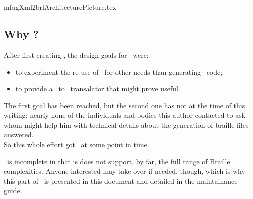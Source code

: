 



\chapter{\xmlToBrl\ }

{mfugXml2brlArchitecturePicture.tex}


\section{Why \xmlToBrl?}

After first creating \xmlToLy, the design goals for \xmlToBrl\ were:
\begin{itemize}
\item to experiment the re-use of \msrRepr\ for other needs than generating \lily\ code;
\item to provide a \mxml\ to \braille\ transalator that might prove useful.
\end{itemize}

The first goal has been reached, but the second one has not at the time of this writing: nearly none of the individuals and bodies this author contacted to ask whom might help him with technical details about the generation of braille files answered.\\
So this whole effort got \frozen\ at some point in time.

\xmlToBrl\ is incomplete in that is does not support, by far, the full range of Braille complexities. Anyone interested may take over if needed, though, which is why this part of \mf\ is presented in this document and detailed in the maintainance guide.



